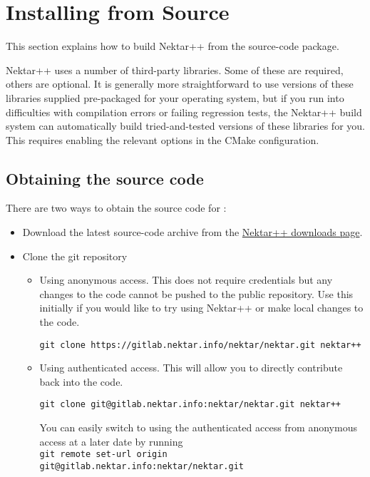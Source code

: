 \section{Installing from Source}
\label{s:installation:source}

This section explains how to build Nektar++ from the source-code package.

Nektar++ uses a number of third-party libraries. Some of these are required,
others are optional. It is generally more straightforward to use versions of
these libraries supplied pre-packaged for your operating system, but if you run
into difficulties with compilation errors or failing regression tests, the
Nektar++ build system can automatically build tried-and-tested versions of these
libraries for you. This requires enabling the relevant options in the CMake
configuration.


\subsection{Obtaining the source code}
\label{s:installation:source:obtainingsource}
There are two ways to obtain the source code for \nekpp:
\begin{itemize}
	\item Download the latest source-code archive from the
	\href{http://www.nektar.info/downloads}{Nektar++ downloads page}.
	\item Clone the git repository
	\begin{itemize}
	\item Using anonymous access. This does not require
	credentials but any changes to the code cannot be pushed to the
	public repository. Use this initially if you would like to try using
	Nektar++ or make local changes to the code.
    \begin{lstlisting}[style=BashInputStyle]
        git clone https://gitlab.nektar.info/nektar/nektar.git nektar++
    \end{lstlisting}
	\item Using authenticated access. This will allow you to directly contribute
	back into the code.
    \begin{lstlisting}[style=BashInputStyle]
        git clone git@gitlab.nektar.info:nektar/nektar.git nektar++
    \end{lstlisting}
    \begin{tipbox}
    You can easily switch to using the authenticated access from anonymous
    access at a later date by running\\
    \footnotesize\texttt{git remote set-url origin git@gitlab.nektar.info:nektar/nektar.git}
    \end{tipbox}
	\end{itemize}
\end{itemize}

